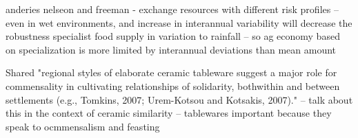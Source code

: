 \documentclass[fleqn,10pt]{wlscirep}
\begin{document}
anderies nelseon and freeman - exchange resources with different risk profiles -- even in wet environments, and increase in interannual variability will decrease the robustness specialist food supply in variation to rainfall -- so ag economy based on specialization is more limited by interannual deviations than mean amount




Shared "regional styles of elaborate ceramic tableware suggest a major role for commensality in cultivating relationships of solidarity, bothwithin and between settlements (e.g., Tomkins, 2007; Urem-Kotsou
and Kotsakis, 2007)." -- talk about this in the context of ceramic similarity -- tablewares important because they speak to ocmmensalism and feasting
\end{document}
